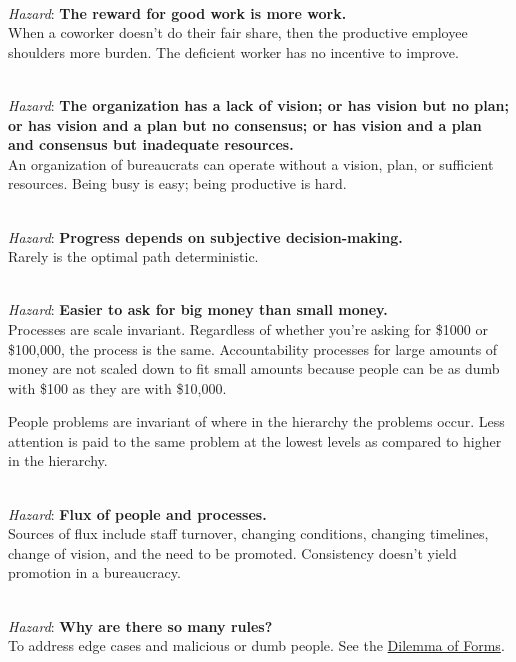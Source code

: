 \ \\
\textit{Hazard}: \textbf{The reward for good work is more work.}\\
When a coworker doesn't do their fair share, then the productive employee shoulders more burden. The deficient worker has no incentive to improve.

\ \\
\textit{Hazard}: \textbf{The organization has a lack of vision; or has vision but no plan; or has vision and a plan but no consensus; or has vision and a plan and consensus but inadequate resources.}\\
An organization of bureaucrats can operate without a vision, plan, or sufficient resources. Being busy is easy; being productive is hard.

\ \\
\textit{Hazard}: \textbf{Progress depends on subjective decision-making.}\\
Rarely is the optimal path deterministic. 

\ \\
\textit{Hazard}: \textbf{Easier to ask for big money than small money.}\\
Processes are scale invariant. Regardless of whether you're asking for \$1000 or \$100,000, the process is the same. Accountability processes for large amounts of money are not scaled down to fit small amounts because people can be as dumb with \$100 as they are with \$10,000.


People problems are invariant of where in the hierarchy the problems occur. Less attention is paid to the same problem at the lowest levels as compared to higher in the hierarchy.


\ \\
\textit{Hazard}: \textbf{Flux of people and processes.} \\
Sources of flux include staff turnover, changing conditions, changing timelines, change of vision, and the need to be promoted. Consistency doesn't yield promotion in a bureaucracy.

\ \\
\textit{Hazard}: \textbf{Why are there so many rules?}\\
To address edge cases and malicious or dumb people. See the \hyperref[table:dilemma-subject-forms]{Dilemma of Forms}.

